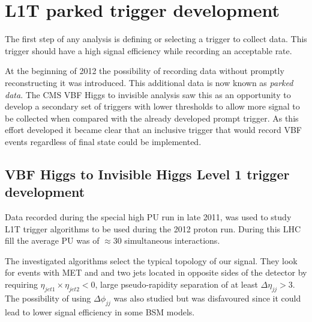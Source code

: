 \section{L1T parked trigger development}
\label{SECTION:PreparationParkedDataAnalysis_ParkedTriggerDevelopment}


The first step of any analysis is defining or selecting a trigger to collect data. This trigger should have a high signal efficiency while recording an acceptable rate.

At the beginning of 2012 the possibility of recording data without promptly reconstructing it was introduced. This additional data is now known as \textit{parked data}. The \gls{CMS} \gls{VBF} Higgs to invisible analysis saw this as an opportunity to develop a secondary set of triggers with lower thresholds to allow more signal to be collected when compared with the already developed prompt trigger. As this effort developed it became clear that an inclusive trigger that would record \gls{VBF} events regardless of final state could be implemented.

\subsection{VBF Higgs to Invisible Higgs Level 1 trigger development}
\label{SUBSECTION:ParkedDataAnalysis_ParkedTriggerDevelopment_VBFHiggsInvisibleTrigger}


Data recorded during the special high \gls{PU} run in late 2011, was used to study \gls{L1T} trigger algorithms to be used during the 2012 proton run. During this \gls{LHC} fill the average \gls{PU} was of $\approx 30$ simultaneous interactions. 

The investigated algorithms select the typical topology of our signal. They look for events with \gls{MET} and and two jets located in opposite sides of the detector by requiring $\eta_{jet1}\times\eta_{jet2}<0$, large pseudo-rapidity separation of at least $\Delta\eta_{jj}>3$. The possibility of using $\Delta\phi_{jj}$ was also studied but was disfavoured since it could lead to lower signal efficiency in some \gls{BSM} models.

